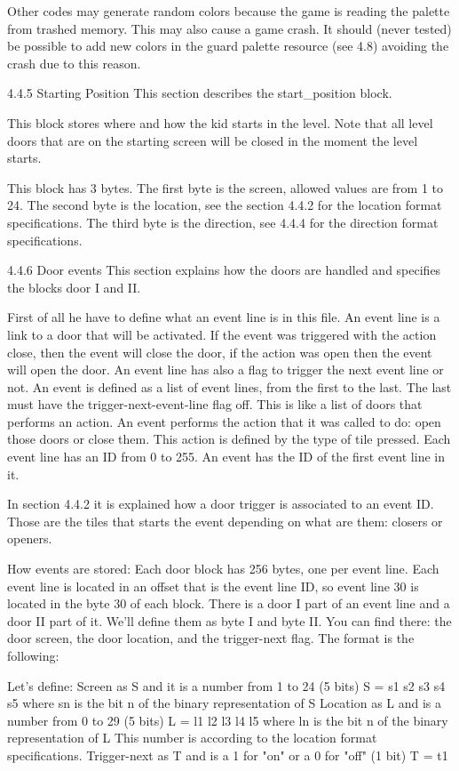  Other codes may generate random colors because the game is reading
 the palette from trashed memory. This may also cause a game crash.
 It should (never tested) be possible to add new colors in the guard
 palette resource (see 4.8) avoiding the crash due to this reason.


4.4.5 Starting Position
 This section describes the start_position block.

 This block stores where and how the kid starts in the level. Note that all
 level doors that are on the starting screen will be closed in the moment
 the level starts.

 This block has 3 bytes.
 The first byte is the screen, allowed values are from 1 to 24.
 The second byte is the location, see the section 4.4.2 for the location
 format specifications.
 The third byte is the direction, see 4.4.4 for the direction format
 specifications.

4.4.6 Door events
 This section explains how the doors are handled and specifies the blocks
 door I and II.

 First of all he have to define what an event line is in this file. An
 event line is a link to a door that will be activated. If the event was
 triggered with the action close, then the event will close the door, if
 the action was open then the event will open the door. An event line has
 also a flag to trigger the next event line or not.
 An event is defined as a list of event lines, from the first to the last.
 The last must have the trigger-next-event-line flag off. This is like a
 list of doors that performs an action.
 An event performs the action that it was called to do: open those doors or
 close them. This action is defined by the type of tile pressed.
 Each event line has an ID from 0 to 255. An event has the ID of the first
 event line in it.

 In section 4.4.2 it is explained how a door trigger is associated to an
 event ID. Those are the tiles that starts the event depending on what are
 them: closers or openers.

 How events are stored:
 Each door block has 256 bytes, one per event line. Each event line is
 located in an offset that is the event line ID, so event line 30 is
 located in the byte 30 of each block.
 There is a door I part of an event line and a door II part of it. We'll
 define them as byte I and byte II.
 You can find there: the door screen, the door location, and the
 trigger-next flag. The format is the following:

 Let's define:
  Screen as S and it is a number from 1 to 24 (5 bits)
   S = s1 s2 s3 s4 s5
    where sn is the bit n of the binary representation of S
  Location as L and is a number from 0 to 29 (5 bits)
   L = l1 l2 l3 l4 l5
    where ln is the bit n of the binary representation of L
   This number is according to the location format specifications.
  Trigger-next as T and is a 1 for "on" or a 0 for "off" (1 bit)
   T = t1

